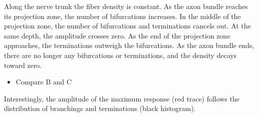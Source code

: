 \documentclass[]{article}
\providecommand{\tightlist}{%
  \setlength{\itemsep}{0pt}\setlength{\parskip}{0pt}}
\begin{document}
Along the nerve trunk the fiber density is constant. As the axon bundle
reaches its projection zone, the number of bifurcations increases. In
the middle of the projection zone, the number of bifurcations and
terminations cancels out. At the same depth, the amplitude crosses zero.
As the end of the projection zone approaches, the terminations outweigh
the bifurcations. As the axon bundle ends, there are no longer any
bifurcations or terminations, and the density decays toward zero.

\begin{itemize}
\tightlist
\item
  Compare B and C
\end{itemize}

Interestingly, the amplitude of the maximum response (red trace) follows
the distribution of branchings and terminations (black histogram).
\end{document}
